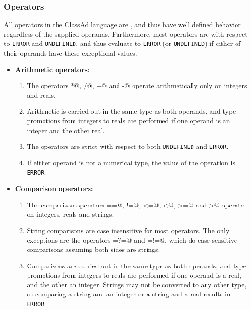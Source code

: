 \subsubsection{Operators}
\label{ClassAd:evaluation-meta}
All operators in the ClassAd language are , and thus have well
defined behavior regardless of the supplied operands.  Furthermore, most
operators are  with respect to \texttt{ERROR} and 
\texttt{UNDEFINED}, and thus evaluate to \texttt{ERROR} (or \texttt{UNDEFINED})
if either of their operands have these exceptional values.

\begin{itemize}
	\item\textbf{Arithmetic operators:}  
	\begin{enumerate}
		\item The operators \verb@*@, \verb@/@, \verb@+@ and \verb@-@ operate 
		arithmetically only on integers and reals.

		\item Arithmetic is carried out in the same type as both operands,
		and type promotions from integers to reals are performed if one operand 
		is an integer and the other real.

		\item The operators are strict with respect to both \texttt{UNDEFINED} 
		and \texttt{ERROR}.  

		\item If either operand is not a numerical type, the value of the
		operation is \texttt{ERROR}.
	\end{enumerate}

	\item\textbf{Comparison operators:}
	\begin{enumerate}
		\item The comparison operators \verb@==@, \verb@!=@, \verb@<=@, 
		\verb@<@, \verb@>=@ and \verb@>@ operate on integers, reals and strings.

		\item String comparisons are case insensitive for most operators.  The only
		exceptions are the operators \verb@=?=@ and \verb@=!=@, which do case sensitive
		comparisons assuming both sides are strings. 

		\item Comparisons are carried out in the same type as both operands,
		and type promotions from integers to reals are performed if one operand
		is a real, and the other an integer.  Strings may not be converted to
		any other type, so comparing a string and an integer or a
		string and a real results in \texttt{ERROR}.


\end{enumerate}
\end{itemize}
